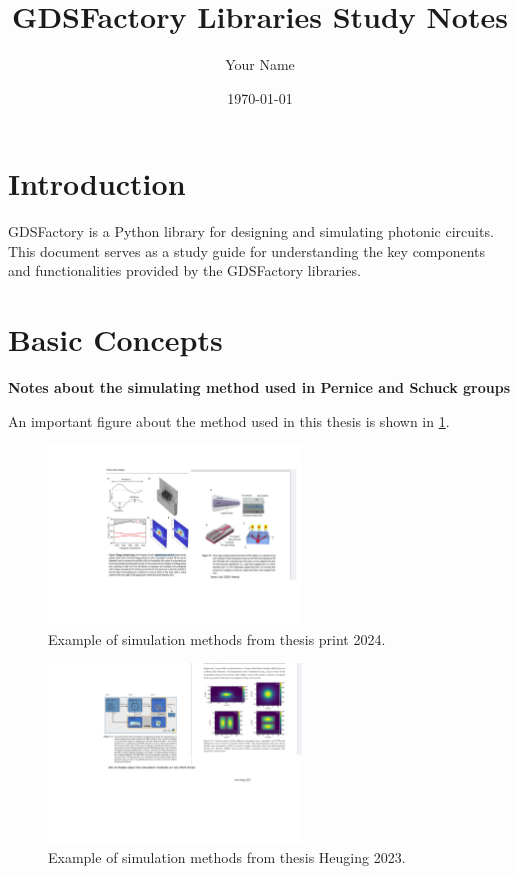 \documentclass[a4paper,12pt]{article}
\title{GDSFactory Libraries Study Notes}
\author{Your Name}
\date{\today}
\begin{document}
\maketitle

\tableofcontents %

\section{Introduction}

GDSFactory is a Python library for designing and simulating photonic circuits. This document serves as a study guide for understanding the key components and functionalities provided by the GDSFactory libraries.

\section{Basic Concepts}

\textbf{Notes about the simulating method used in Pernice and Schuck groups}

An important figure about the method used in this thesis is shown in \cref{fig:sim_methods}.

\begin{figure}[h]
  \centering
  \includegraphics[width=0.6\textwidth]{figs/sim_methods.pdf} %
  \caption{Example of simulation methods from thesis print 2024.}
  \label{fig:sim_methods}
\end{figure}


\begin{figure}[h]
  \centering
  \includegraphics[width=0.6\textwidth]{figs/sim_1.pdf} %
  \caption{Example of simulation methods from thesis Heuging  2023.}
  \label{sim_1}
\end{figure}
\end{document}
